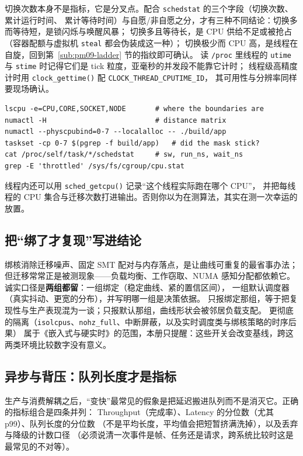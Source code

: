 \documentclass[12pt,a4paper,fontset=fandol]{ctexbook}
\newcommand{\Fn}[1]{\texttt{#1()}}
\newcommand{\Tp}[1]{\texttt{#1}}
\newcommand{\Bk}{\discretionary{}{}{}}
\newcommand{\Lang}[1]{\textsf{#1}}
\newcommand{\MCpu}{\Lang{CPU}}
\newcommand{\MLat}{\Lang{Latency}}
\newcommand{\MThr}{\Lang{Throughput}}
\newcommand{\Mx}[1]{\textsf{#1}}
\begin{document}
切换次数本身不是指标，它是分叉点。配合 \Tp{schedstat} 的三个字段（切换次数、累计运行时间、
累计等待时间）与自愿/非自愿之分，才有三种不同结论：切换多而等待短，是锁闪烁与唤醒风暴；
切换多且等待长，是 CPU 供给不足或被抢占（容器配额与虚拟机 \Tp{steal} 都会伪装成这一种）；
切换极少而 \MCpu{} 高，是线程在自旋，回到第~\ref{sub:pm09-ladder} 节的指纹即可确认。
读 \Tp{/proc} 里线程的 \Tp{utime} 与 \Tp{stime} 时记得它们是 tick 粒度，亚毫秒的并发段不能靠它计时；
线程级高精度计时用 \Fn{clock\_gettime} 配 \Tp{CLOCK{\Bk}\_THREAD{\Bk}\_CPUTIME{\Bk}\_ID}，
其可用性与分辨率同样要现场确认。

\begin{lstlisting}[style=shellstyle, label={lst:pm09-aff},
caption={拓扑、亲和性与迁移证据的命令骨架（格式示例，输出由读者在自己机器上得到）。}]
lscpu -e=CPU,CORE,SOCKET,NODE       # where the boundaries are
numactl -H                          # distance matrix
numactl --physcpubind=0-7 --localalloc -- ./build/app
taskset -cp 0-7 $(pgrep -f build/app)   # did the mask stick?
cat /proc/self/task/*/schedstat     # sw, run_ns, wait_ns
grep -E 'throttled' /sys/fs/cgroup/cpu.stat
\end{lstlisting}

线程内还可以用 \Fn{sched\_getcpu} 记录``这个线程实际跑在哪个 CPU''，
并把每线程的 CPU 集合与迁移次数打进输出。否则你以为在测算法，其实在测一次幸运的放置。

\subsection{把``绑了才复现''写进结论}

绑核消除迁移噪声、固定 SMT 配对与内存落点，是让曲线可重复的最省事办法；
但迁移常常正是被测现象——负载均衡、工作窃取、NUMA 感知分配都依赖它。
诚实口径是\textbf{两组都留}：一组绑定（稳定曲线、紧的置信区间），
一组默认调度器（真实抖动、更宽的分布），并写明哪一组是决策依据。
只报绑定那组，等于把复现性与生产表现混为一谈；只报默认那组，曲线形状会被邻居负载支配。
更彻底的隔离（\Tp{isolcpus}、\Tp{nohz\_full}、中断屏蔽，以及实时调度类与绑核策略的时序后果）
属于《嵌入式与硬实时》的范围，本册只提醒：这些开关会改变基线，跨这两类环境比较数字没有意义。

\subsection{异步与背压：队列长度才是指标}
\label{sub:pm09-backpressure}

生产与消费解耦之后，``变快''最常见的假象是把延迟搬进队列而不是消灭它。正确的指标组合是四条并列：
\MThr{}（完成率）、\MLat{} 的分位数（尤其 \Mx{p99}）、队列长度的分位数
（不是平均长度，平均值会把短暂挤满洗掉），以及丢弃与降级的计数口径
（必须说清一次事件是帧、任务还是请求，跨系统比较时这是最常见的不对等）。
\end{document}
